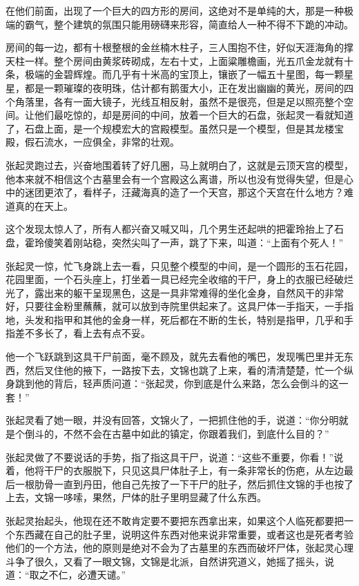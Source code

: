 在他们前面，出现了一个巨大的四方形的房间，这绝对不是单纯的大，那是一种极端的霸气，整个建筑的氛围只能用磅礴来形容，简直给人一种不得不下跪的冲动。

房间的每一边，都有十根整根的金丝楠木柱子，三人围抱不住，好似天涯海角的撑天柱一样。整个房间由黄浆砖砌成，左右十丈，上面粱雕檐画，光五爪金龙就有十条，极端的金碧辉煌。而几乎有十米高的宝顶上，镶嵌了一幅五十星图，每一颗星星，都是一颗璀璨的夜明珠，估计都有鹅蛋大小，正在发出幽幽的黄光，房间的四个角落里，各有一面大镜子，光线互相反射，虽然不是很亮，但是足以照亮整个空间。让他们最吃惊的，却是房间的中间，放着一个巨大的石盘，张起灵一看就知道了，石盘上面，是一个规模宏大的宫殿模型。虽然只是一个模型，但是其龙楼宝殿，假石流水，一应俱全，非常的壮观。

张起灵跑过去，兴奋地围着转了好几圈，马上就明白了，这就是云顶天宫的模型，他本来就不相信这个古墓里会有一个宫殿这么离谱，所以也没有觉得失望，但是心中的迷团更浓了，看样子，汪藏海真的造了一个天宫，那这个天宫在什么地方？难道真的在天上。

这个发现太惊人了，所有人都兴奋又喊又叫，几个男生还起哄的把霍玲抬上了石盘，霍玲傻笑着刚站稳，突然尖叫了一声，跳了下来，叫道：“上面有个死人！”

张起灵一惊，忙飞身跳上去一看，只见整个模型的中间，是一个圆形的玉石花园，花园里面，一个石头座上，打坐着一具已经完全收缩的干尸，身上的衣服已经破烂光了，露出来的躯干呈现黑色，这是一具非常难得的坐化金身，自然风干的非常好，只要往金粉里蘸蘸，就可以放到寺院里供起来了。这具尸体一手指天，一手指地，头发和指甲和其他的金身一样，死后都在不断的生长，特别是指甲，几乎和手指差不多长了，看上去有点不妥。

他一个飞跃跳到这具干尸前面，毫不顾及，就先去看他的嘴巴，发现嘴巴里并无东西，然后叉住他的掖下，一路按下去，文锦也跳了上来，看的清清楚楚，忙一个纵身跳到他的背后，轻声质问道：“张起灵，你到底是什么来路，怎么会倒斗的这一套！”

张起灵看了她一眼，并没有回答，文锦火了，一把抓住他的手，说道：“你分明就是个倒斗的，不然不会在古墓中如此的镇定，你跟着我们，到底什么目的？”

张起灵做了不要说话的手势，指了指这具干尸，说道：“这些不重要，你看！”说着，他将干尸的衣服脱下，只见这具尸体肚子上，有一条非常长的伤疤，从左边最后一根肋骨一直到丹田，他自己先按了一下干尸的肚子，然后抓住文锦的手也按了上去，文锦一哆嗦，果然，尸体的肚子里明显藏了什么东西。

张起灵抬起头，他现在还不敢肯定要不要把东西拿出来，如果这个人临死都要把一个东西藏在自己的肚子里，说明这件东西对他来说非常重要，或者这也是死者考验他们的一个方法，他的原则是绝对不会为了古墓里的东西而破坏尸体，张起灵心理斗争了很久，又看了一眼文锦，文锦是北派，自然讲究道义，她摇了摇头，说道：“取之不仁，必遭天谴。”

